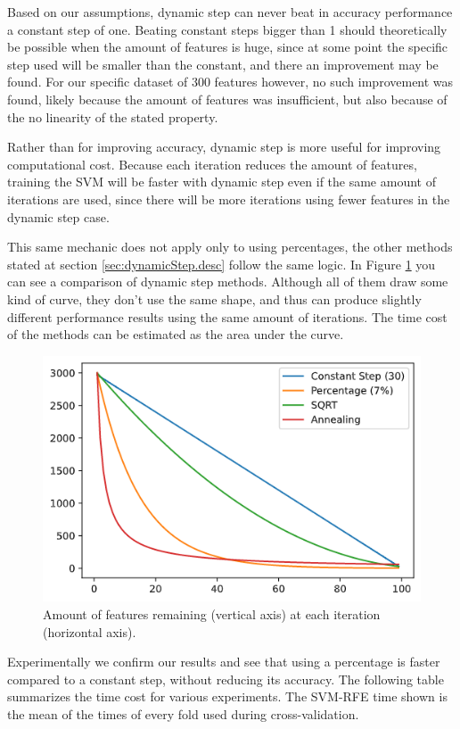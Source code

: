 Based on our assumptions, dynamic step can never beat in accuracy performance a constant step of one. Beating constant steps bigger than 1 should theoretically be possible when the amount of features is huge, since at some point the specific step used will be smaller than the constant, and there an improvement may be found. For our specific dataset of 300 features however, no such improvement was found, likely because the amount of features was insufficient, but also because of the no linearity of the stated property.

Rather than for improving accuracy, dynamic step is more useful for improving computational cost. Because each iteration reduces the amount of features, training the SVM will be faster with dynamic step even if the same amount of iterations are used, since there will be more iterations using fewer features in the dynamic step case.

This same mechanic does not apply only to using percentages, the other methods stated at section \ref{sec:dynamicStep.desc} follow the same logic. In Figure \ref{fig:dynamicStep.compare} you can see a comparison of dynamic step methods. Although all of them draw some kind of curve, they don't use the same shape, and thus can produce slightly different performance results using the same amount of iterations. The time cost of the methods can be estimated as the area under the curve.

\begin{figure}[h]
    \centering
    \includegraphics[width=0.4\linewidth]{img/comparetimes.png}
    \caption{Amount of features remaining (vertical axis) at each iteration (horizontal axis).}
    \label{fig:dynamicStep.compare}
\end{figure}

Experimentally we confirm our results and see that using a percentage is faster compared to a constant step, without reducing its accuracy. The following table summarizes the time cost for various experiments. The SVM-RFE time shown is the mean of the times of every fold used during cross-validation.

